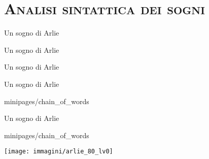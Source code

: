 \documentclass[xcolor=x11names,compress]{beamer}
\begin{document}
\section{\scshape Analisi sintattica dei sogni}
{
\begin{frame}[t]{Un sogno di Arlie}
    \vspace{-0.2cm}
    
\end{frame}}

{
\begin{frame}[t]{Un sogno di Arlie}
    \vspace{-0.2cm}
    
\end{frame}}

{
\begin{frame}[t]{Un sogno di Arlie}
    \vspace{-0.2cm}
    
\end{frame}}

{
\begin{frame}[t]{Un sogno di Arlie}
    \vspace{-0.2cm}
    
    
     {minipages/chain_of_words}
\end{frame}}

{
\begin{frame}[t]{Un sogno di Arlie}
    \vspace{-0.2cm}
    
    
     {minipages/chain_of_words}
    
    \begin{minipage}[t]{\textwidth}
        \hspace{-0.715cm}
        \texttt{[image: immagini/arlie\_80\_lv0]}
    \end{minipage}
\end{frame}}
\end{document}
